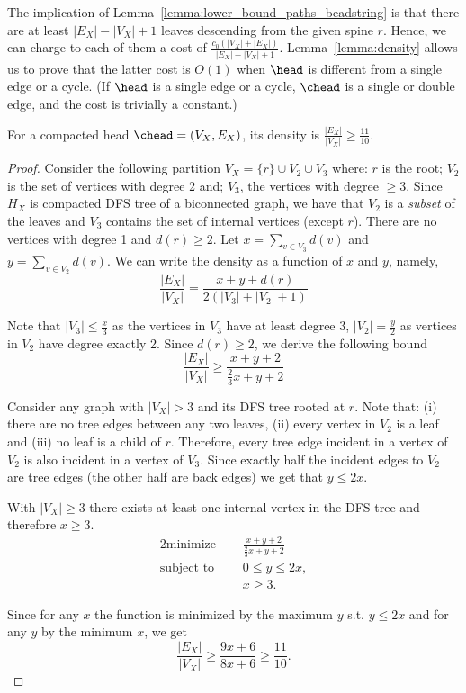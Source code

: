 The implication of Lemma~\ref{lemma:lower_bound_paths_beadstring} is
that there are at least $|E_X| - |V_X| + 1$ leaves descending from the
given spine $r$. Hence, we can charge to each of them a cost of
$\frac{c_0 (|V_X| + |E_X|)}{|E_X| - |V_X| +
  1}$. Lemma~\ref{lemma:density} allows us to prove that the latter
cost is $O(1)$ when $\head$ is different from a single edge or a
cycle. (If $\head$ is a single edge or a cycle, $\chead$ is a
  single or double edge, and the cost is trivially a constant.)
\begin{lemma}
  \label{lemma:density}
  For a compacted head $\chead = (V_X, E_X)$, its density is
  $\frac{|E_X|}{|V_X|} \geq \frac{11}{10}$.
\end{lemma}
\begin{proof}
	Consider the following partition $V_X = \{r\} \cup V_2 \cup
	V_3$ where: $r$ is the root; $V_2$ is the set of vertices with
	degree 2 and; $V_3$, the vertices with degree $\geq 3$.  Since
	$H_X$ is compacted DFS tree of a biconnected graph, we have
	that $V_2$ is a \emph{subset} of the leaves and $V_3$ contains
	the set of internal vertices (except $r$). There are no vertices
	with degree 1 and $d(r) \geq 2$. Let $x = \sum_{v \in V_3}
	d(v)$ and $y = \sum_{v \in V_2} d(v)$.  We can write the
	density as a function of $x$ and $y$, namely,
	$$\frac{|E_X|}{|V_X|} = \frac{x + y + d(r)}{2 (|V_3| + |V_2| + 1)} $$

	Note that $|V_3| \le \frac{x}{3}$ as the vertices in $V_3$
	have at least degree 3, $|V_2| = \frac{y}{2}$ as vertices in
	$V_2$ have degree exactly 2. Since $d(r) \ge 2$, we derive the
	following bound
	$$\frac{|E_X|}{|V_X|} \ge \frac{x + y + 2}{\frac{2}{3}x + y + 2} $$

	Consider any graph with $|V_X|>3$ and its DFS tree rooted at
        $r$. Note that: (i) there are no tree edges between any two
        leaves, (ii) every vertex in $V_2$ is a leaf and (iii) no leaf
        is a child of $r$.  Therefore, every tree edge incident in a
        vertex of $V_2$ is also incident in a vertex of $V_3$. Since
        exactly half the incident edges to $V_2$ are tree edges (the
        other half are back edges) we get that $y \le 2x$.

	With $|V_X| \ge 3$ there exists at least one internal vertex in
	the DFS tree and therefore $x \ge 3$.
 \begin{alignat*}{2}
	 \text{minimize }\quad   & \frac{x + y + 2}{\frac{2}{3}x + y + 2}\ \\
	 \text{subject to }\quad  & 0 \le y \le 2x, \\
	 		    & x \ge 3.
  \end{alignat*}

 Since for any $x$ the function is minimized by the maximum $y$ s.t.
 $y \le 2x$ and for any $y$ by the minimum $x$, we get
 $$\frac{|E_X|}{|V_X|} \ge \frac{9x + 6}{8x + 6} \ge
 \frac{11}{10}.$$ 
\end{proof}


